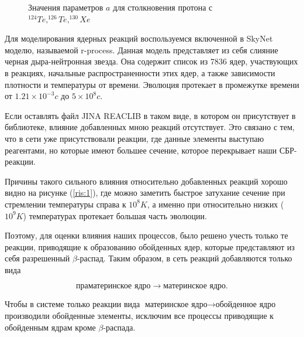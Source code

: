 \documentclass[14pt, a4paper]{article}
\numberwithin{figure}{section}
\numberwithin{equation}{section}
\begin{document}
\begin{figure}
	\caption{Значения параметров $a$ для столкновения протона с $^{124}Te, ^{126}Te, ^{130}Xe$}
	\label{ris:a-4}
\end{figure}

Для моделирования ядерных реакций воспользуемся включенной в SkyNet моделю, называемой r-process. Данная модель представляет из себя слияние черная дыра-нейтронная звезда. Она содержит список из 7836 ядер, участвующих в реакциях, начальные распространенности этих ядер, а также зависимости плотности и температуры от времени. Эволюция протекает в промежутке времени от $1.21\times 10^{-3}c$ до $5\times 10^8c$. 

Если оставлять файл JINA REACLIB в таком виде, в котором он присутствует в библиотеке, влияние добавленных мною реакций отсутствует. Это связано с тем, что в сети уже присутствовали реакции, где данные элементы выступаю реагентами, но которые имеют большее сечение, которое перекрывает наши СБР-реакции. 

Причины такого сильного влияния относительно добавленных реакций хорошо видно на рисунке  (\ref{ris:1}), где  можно заметить быстрое затухание сечение при стремлении температуры справа к $10^8 K$, а именно при относительно низких ($10^9 K$) температурах протекает большая часть эволюции. 

Поэтому, для оценки влияния наших процессов, было решено учесть только те реакции, приводящие к образованию обойденных ядер, которые представляют из себя разрешенный $\beta$-распад. Таким образом, в сеть реакций добавляются только вида 

$$\text{праматеринское ядро} \to \text{материнское ядро}.$$

Чтобы в системе только реакции вида $\text{материнское ядро} \to \text{обойденное ядро}$ производили обойденные элементы, исключим все процессы приводящие к обойденным ядрам кроме $\beta$-распада. 
\end{document}
